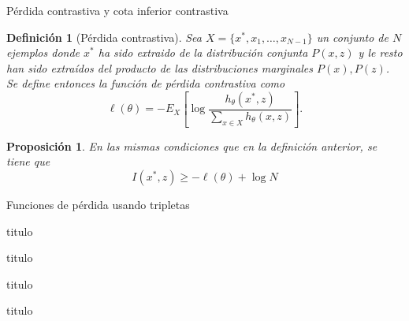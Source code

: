 \documentclass[aspectratio=169]{beamer}
\newtheorem{defi}{Definición}
\newtheorem{prop}{Proposición}
\begin{document}
  
  \begin{frame}{Pérdida contrastiva y cota inferior contrastiva}
    
    \begin{defi}[Pérdida contrastiva]
      Sea \(X =\{x^*,x_1,\dots,x_{N-1}\}\) un conjunto de \(N\) ejemplos donde $x^*$ ha sido extraido de la distribución conjunta \(P(x,z)\) y le resto han sido extraídos del producto de las distribuciones marginales \(P(x),P(z)\). Se define entonces la función de pérdida contrastiva como  
      \[ 
        \ell(\theta) = - E_X \left[ \log \frac{h_\theta(x^*,z)}{\sum_{x \in X}h_\theta(x,z)}\right]. 
        \]
    \end{defi}

    \begin{prop}
      En las mismas condiciones que en la definición anterior, se tiene que
      \[
        I(x^*,z) \geq -  \ell(\theta) + \log N
      \]
    \end{prop}
  
  \end{frame}
  
  \begin{frame}{Funciones de pérdida usando tripletas}
  
  \end{frame}
  
  \begin{frame}{titulo}
  
  \end{frame}
  
  \begin{frame}{titulo}
  
  \end{frame}

  
  \begin{frame}{titulo}
  
  \end{frame}
  
  \begin{frame}{titulo}
  
  \end{frame}
\end{document}
